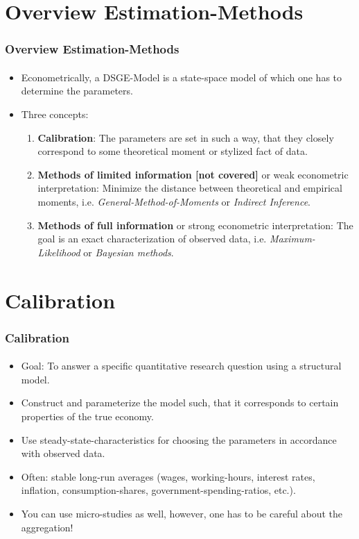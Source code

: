 \documentclass[handout]{beamer}  %
\begin{document}
\section{Overview Estimation-Methods}
\begin{frame}\frametitle{Overview Estimation-Methods}\framesubtitle{}
\begin{itemize}
    \item Econometrically, a DSGE-Model is a state-space model of which
        one has to determine the parameters.
      \item Three concepts:
      \begin{enumerate}
        \item \textbf{Calibration}: The parameters are set in such a
            way, that they closely correspond to some theoretical
            moment or stylized fact of data.
        \item \textbf{Methods of limited information [not covered]} or weak
            econometric interpretation: Minimize the distance between
            theoretical and empirical moments, i.e.
            \emph{General-Method-of-Moments} or \emph{Indirect
            Inference}.
        \item \textbf{Methods of full information} or strong
            econometric interpretation: The goal is an exact
            characterization of observed data, i.e.
            \emph{Maximum-Likelihood} or \emph{Bayesian methods}.
      \end{enumerate}
\end{itemize}
\end{frame}

\section{Calibration}
\begin{frame}\frametitle{Calibration}\framesubtitle{}
\begin{itemize}
   \item Goal: To answer a specific quantitative research question using
       a structural model.
   \item Construct and parameterize the model such, that it corresponds
       to certain properties of the true economy.
   \item Use steady-state-characteristics for choosing the parameters in
       accordance with observed data.
   \item Often: stable long-run averages (wages, working-hours, interest
       rates, inflation, consumption-shares, government-spending-ratios,
       etc.).
   \item You can use micro-studies as well, however, one has to be
       careful about the aggregation!
\end{itemize}
\end{frame}
\end{document}
